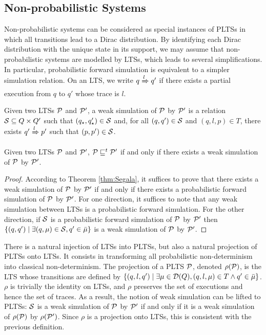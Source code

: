 \subsection{Non-probabilistic Systems}

Non-probabilistic systems can be considered as special instances of PLTSs in which all transitions
lead to a Dirac distribution. By identifying each Dirac distribution with the unique state in its
support, we may assume that non-probabilistic systems are modelled by LTSs, which leads to several
simplifications. In particular, probabilistic forward simulation is equivalent to a simpler
simulation relation. On an LTS, we write $q \xRightarrow{l} q'$ if there exists a partial execution
from $q$ to $q'$ whose trace is $l$.

\begin{definition}

    Given two LTSs $\mathcal{P}$ and $\mathcal{P}'$, a weak simulation of $\mathcal{P}$ by $\mathcal{P}'$ is a
    relation $\mathcal{S} \subseteq Q \times Q'$ such that $(q_\star,q_\star') \in \mathcal{S}$ and,
    for all $(q,q') \in \mathcal{S}$ and $(q,l,p) \in T$,
    there exists $q' \xRightarrow{l} p'$ such that $(p,p') \in \mathcal{S}$.
\end{definition}

\begin{lemma}
    \label{lem:weaksim}
    Given two LTSs $\mathcal{P}$ and $\mathcal{P}'$, $\mathcal{P} \sqsubseteq^t \mathcal{P}'$ if and only if there exists a
    weak simulation of $\mathcal{P}$ by $\mathcal{P}'$.
\end{lemma}
\begin{proof}
    According to Theorem \ref{thm:Segala}, it suffices to prove that
    there exists a weak simulation of $\mathcal{P}$ by $\mathcal{P}'$ if and only if
    there exists a probabilistic forward simulation of $\mathcal{P}$ by $\mathcal{P}'$. For one direction,
    it suffices to note that any weak simulation between LTSs is a probabilistic forward simulation.
    For the other direction, if $\mathcal{S}$ is a probabilistic forward simulation of $\mathcal{P}$ by $\mathcal{P}'$
    then $\{(q,q') \mid \exists (q,\mu) \in \mathcal{S}, q' \in \bar\mu\}$ is a weak simulation of $\mathcal{P}$
    by $\mathcal{P}'$.
\end{proof}

There is a natural injection of LTSs into PLTSs, but also a natural projection of PLTSs onto LTSs.
It consists in transforming all probabilistic non-determinism into classical non-determinism.
The projection of a PLTS $\mathcal{P}$, denoted $\rho(\mathcal{P})$, is the LTS whose transitions are defined
by $\{(q,l,q') \mid \exists \mu \in \mathcal{D}(Q), (q,l,\mu) \in T \wedge q' \in \bar\mu\}$.
$\rho$ is trivially the identity on LTSs, and $\rho$ preserves the set of executions and hence the
set of traces. As a result, the notion of weak simulation can be lifted to PLTSs: $\mathcal{S}$ is a weak
simulation of $\mathcal{P}$ by $\mathcal{P}'$ if and only if it is a weak simulation of $\rho(\mathcal{P})$ by
$\rho(\mathcal{P}')$. Since $\rho$ is a projection onto LTSs, this is consistent with the previous
definition.

